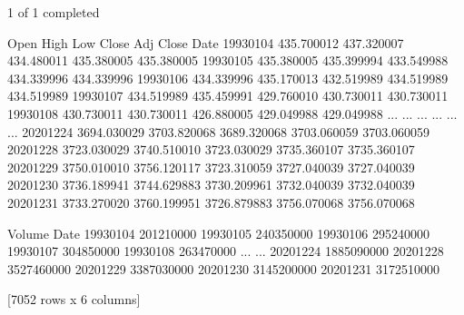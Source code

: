 \documentclass[letterpaper,10pt,english]{jupyterBook}
\begin{document}
\begin{sphinxVerbatim}[commandchars=\\\{\}]
    
\end{sphinxVerbatim}

\begin{sphinxVerbatim}[commandchars=\\\{\}]
[*********************100\PYGZpc{}***********************]  1 of 1 completed
\end{sphinxVerbatim}

\begin{sphinxVerbatim}[commandchars=\\\{\}]
                   Open         High          Low        Close    Adj Close  \PYGZbs{}
Date                                                                          
1993\PYGZhy{}01\PYGZhy{}04   435.700012   437.320007   434.480011   435.380005   435.380005   
1993\PYGZhy{}01\PYGZhy{}05   435.380005   435.399994   433.549988   434.339996   434.339996   
1993\PYGZhy{}01\PYGZhy{}06   434.339996   435.170013   432.519989   434.519989   434.519989   
1993\PYGZhy{}01\PYGZhy{}07   434.519989   435.459991   429.760010   430.730011   430.730011   
1993\PYGZhy{}01\PYGZhy{}08   430.730011   430.730011   426.880005   429.049988   429.049988   
...                 ...          ...          ...          ...          ...   
2020\PYGZhy{}12\PYGZhy{}24  3694.030029  3703.820068  3689.320068  3703.060059  3703.060059   
2020\PYGZhy{}12\PYGZhy{}28  3723.030029  3740.510010  3723.030029  3735.360107  3735.360107   
2020\PYGZhy{}12\PYGZhy{}29  3750.010010  3756.120117  3723.310059  3727.040039  3727.040039   
2020\PYGZhy{}12\PYGZhy{}30  3736.189941  3744.629883  3730.209961  3732.040039  3732.040039   
2020\PYGZhy{}12\PYGZhy{}31  3733.270020  3760.199951  3726.879883  3756.070068  3756.070068   

                Volume  
Date                    
1993\PYGZhy{}01\PYGZhy{}04   201210000  
1993\PYGZhy{}01\PYGZhy{}05   240350000  
1993\PYGZhy{}01\PYGZhy{}06   295240000  
1993\PYGZhy{}01\PYGZhy{}07   304850000  
1993\PYGZhy{}01\PYGZhy{}08   263470000  
...                ...  
2020\PYGZhy{}12\PYGZhy{}24  1885090000  
2020\PYGZhy{}12\PYGZhy{}28  3527460000  
2020\PYGZhy{}12\PYGZhy{}29  3387030000  
2020\PYGZhy{}12\PYGZhy{}30  3145200000  
2020\PYGZhy{}12\PYGZhy{}31  3172510000  

[7052 rows x 6 columns]
\end{sphinxVerbatim}
\end{document}
